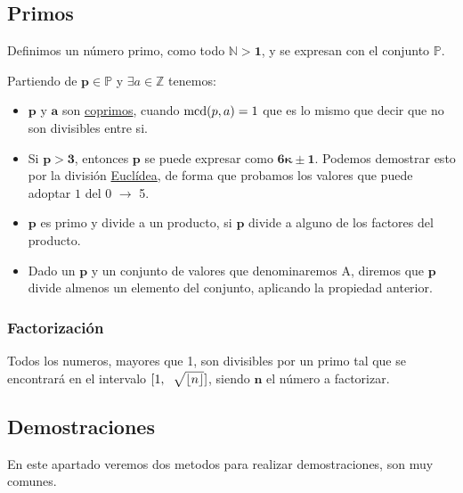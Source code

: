 \subsection{Primos}
\noindent Definimos un número primo, como todo \(\mathbf{\mathbb{N} > 1}\), y se expresan con el conjunto \(\mathbf{\mathbb{P}}\).\par
\noindent{} \par
\noindent Partiendo de \(\mathbf{ p \in \mathbb{P}}\) y \(\exists a \in \mathbb{Z}\) tenemos:
\begin{itemize}
        \item \(\mathbf{p}\) y \(\mathbf{a}\) son \underline{coprimos}, cuando \(\textnormal{mcd}(p,a) = 1\) que es lo mismo que decir que no son divisibles entre si.
        \item Si \(\mathbf{p > 3}\), entonces \(\mathbf{p}\) se puede expresar como \(\mathbf{6\kappa \pm 1}\). Podemos demostrar esto por la división \underline{Euclídea}, de forma que probamos los valores que puede adoptar \(1\) del 0 \(\rightarrow\) 5.
        \item \(\mathbf{p}\) es primo y divide a un producto, si \(\mathbf{p}\) divide a alguno de los factores del producto.
        \item Dado un \(\mathbf{p}\) y un conjunto de valores que denominaremos \(\mathbf{\mathrm{A}}\), diremos que \(\mathbf{p}\) divide almenos un elemento del conjunto, aplicando la propiedad anterior.
\end{itemize}
\subsubsection{Factorización}
\noindent Todos los numeros, mayores que 1, son divisibles por un primo tal que se encontrará en el intervalo \([1,\hspace{2mm}\sqrt{\left \lfloor n \right \rfloor}]\), siendo \(\mathbf{n}\) el número a factorizar.
\subsection{Demostraciones}
\noindent En este apartado veremos dos metodos para realizar demostraciones, son muy comunes.
